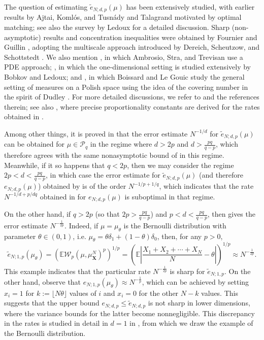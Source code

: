 \documentclass[11pt,reqno]{amsart}
\newcommand{\bX}{{\boldsymbol X}}
\theoremstyle{definition}
\renewcommand{\tilde}{\widetilde}
\renewcommand{\tilde}{\widetilde}
\newcommand{\EE}{{\mathbb E}}
\newcommand{\mcl}{\mathcal}
\theoremstyle{definition}
\numberwithin{equation}{section}
\numberwithin{lemma}{section}
\numberwithin{proposition}{section}
\numberwithin{theorem}{section}
\numberwithin{corollary}{section}
\numberwithin{definition}{section}
\numberwithin{remark}{section}
\begin{document}
The question of estimating $\tilde e_{N;d,p}(\mu)$ has been extensively studied, with earlier results by Ajtai, Koml\'os, and Tusn\'ady \cite{AKT} and Talagrand \cite{T} motivated by optimal matching; see also the survey by Ledoux \cite{Ledoux_survey} for a detailed discussion. Sharp (non-asymptotic) results and concentration inequalities were obtained by Fournier and Guillin \cite{FG}, adopting the multiscale approach introduced by Dereich, Scheutzow, and Schottstedt \cite{DSS}. We also mention \cite{AST}, in which Ambrosio, Stra, and Trevisan use a PDE approach; \cite{BobLed}, in which the one-dimensional setting is studied extensively by Bobkov and Ledoux; and \cite{B-LG}, in which Boissard and Le Gouic study the general setting of measures on a Polish space using the idea of the covering number in the spirit of Dudley \cite{D}. For more detailed discussions, we refer to \cite{FG} and the references therein; see also \cite{F2023}, where precise proportionality constants are derived for the rates obtained in \cite{FG}.

Among other things, it is proved in \cite{FG} that the error estimate $N^{-1/d}$ for $\tilde e_{N;d,p}(\mu)$ can be obtained for $\mu \in \mcl P_q$ in the regime where $d > 2p$ and $d > \frac{pq}{q-p}$, which therefore agrees with the same nonasymptotic bound of \cite[Theorem 1.7]{Q} in this regime. Meanwhile, if it so happens that $q < 2p$, then we may consider the regime $2p < d < \frac{pq}{q-p}$, in which case the error estimate for $\tilde e_{N;d,p}(\mu)$ (and therefore $e_{N;d,p}(\mu)$) obtained by \cite{FG} is of the order $N^{-1/p+1/q}$, which indicates that the rate $N^{-1/d + p/dq}$ obtained in \cite{Chev} for  $e_{N;d,p}(\mu)$ is suboptimal in that regime.

On the other hand, if $q > 2p$ (so that $2p > \frac{pq}{q-p}$) and $p < d < \frac{pq}{q-p}$, then \cite{FG} gives the error estimate $N^{-\frac{1}{2p}}$. 
Indeed, if $\mu = \mu_\theta$ is the Bernoulli distribution with parameter $\theta \in (0,1)$, i.e. $\mu_\theta = \theta \delta_1 + (1-\theta) \delta_0$, then, for any $p > 0$,
\[
	\tilde e_{N; 1,p}(\mu_\theta) = \left( \EE \mcl W_p(\mu, \mu^N_\bX)^p \right)^{1/p} = \left( \EE \left| \frac{X_1 + X_2 + \cdots + X_N}{N} - \theta \right| \right)^{1/p} \approx N^{-\frac{1}{2p}}.
\]
This example indicates that the particular rate $N^{-\frac{1}{2p}}$ is sharp for $\tilde e_{N;1,p}$. On the other hand, observe that $e_{N;1,p}(\mu_\theta) \approx N^{-\frac{1}{p}}$, which can be achieved by setting $x_i = 1$ for $k := \lfloor N\theta \rfloor$ values of $i$ and $x_i = 0$ for the other $N - k$ values. This suggests that the upper bound $e_{N;d,p} \le \tilde e_{N; d,p}$ is not sharp in lower dimensions, where the variance bounds for the latter become nonnegligible. This discrepancy in the rates is studied in detail in $d=1$ in \cite{BX}, from which we draw the example of the Bernoulli distribution.
\end{document}
